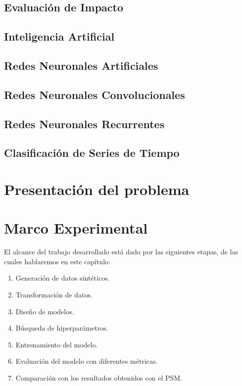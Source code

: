 \documentclass[a4paper,12pt,spanish]{book}
\begin{document}
\section{Evaluación de Impacto}


\section{Inteligencia Artificial}


\section{Redes Neuronales Artificiales}



\section{Redes Neuronales Convolucionales}


\section{Redes Neuronales Recurrentes}


\section{Clasificación de Series de Tiempo}



\chapter{Presentación del problema} \label{sec:problema}



\chapter{Marco Experimental}
El alcance del trabajo desarrollado está dado por las siguientes etapas, de las
cuales hablaremos en este capítulo:
\begin{enumerate}
    \item Generación de datos sintéticos.
    \item Transformación de datos.
    \item Diseño de modelos.
    \item Búsqueda de hiperparámetros.
    \item Entrenamiento del modelo.
    \item Evaluación del modelo con diferentes métricas.
    \item Comparación con los resultados obtenidos con el PSM.
\end{enumerate}
\end{document}
